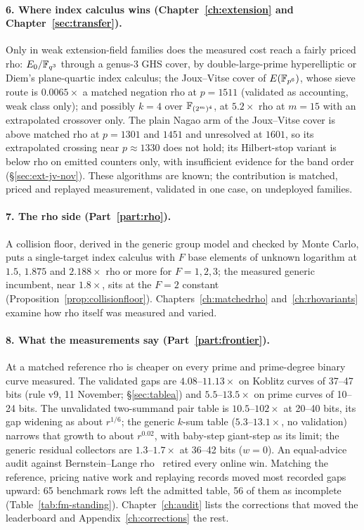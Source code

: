 \paragraph{6. Where index calculus wins (Chapter~\ref{ch:extension} and
Chapter~\ref{sec:transfer}).} Only in weak extension-field families does
the measured cost reach a fairly priced rho: $E_0/\mathbb{F}_{q^3}$ through a
genus-3 GHS cover, by double-large-prime hyperelliptic or Diem's
plane-quartic index calculus; the Joux--Vitse cover of $E(\mathbb{F}_{p^6})$,
whose sieve route is $0.0065\times$ a matched negation rho at $p=1511$
(validated as accounting, weak class only); and possibly $k=4$ over
$\mathbb{F}_{(2^m)^4}$, at $5.2\times$ rho at $m=15$ with an extrapolated
crossover only. The plain Nagao arm of the Joux--Vitse cover is above
matched rho at $p=1301$ and $1451$ and unresolved at $1601$, so its
extrapolated crossing near $p\approx1330$ does not hold; its Hilbert-stop
variant is below rho on emitted counters only, with insufficient evidence
for the band order (\S\ref{sec:ext-jv-nov}). These algorithms
are known; the contribution is matched, priced and replayed measurement,
validated in one case, on undeployed families.

\paragraph{7. The rho side (Part~\ref{part:rho}).} A collision floor,
derived in the generic group model and checked by Monte Carlo, puts a
single-target index calculus with $F$ base elements of unknown logarithm at
$1.5$, $1.875$ and $2.188\times$ rho or more for $F=1,2,3$; the measured
generic incumbent, near $1.8\times$, sits at the $F=2$ constant
(Proposition~\ref{prop:collisionfloor}). Chapters~\ref{ch:matchedrho}
and~\ref{ch:rhovariants} examine how rho itself was measured and varied.

\paragraph{8. What the measurements say (Part~\ref{part:frontier}).} At a
matched reference rho is cheaper on every prime and prime-degree binary
curve measured. The validated gaps are $4.08$--$11.13\times$ on Koblitz
curves of 37--47 bits (rule v9, 11 November; \S\ref{sec:tablea}) and $5.5$--$13.5\times$ on prime curves of 10--24 bits.
The unvalidated two-summand pair table is $10.5$--$102\times$ at 20--40
bits, its gap widening as about $r^{1/6}$; the generic $k$-sum table
($5.3$--$13.1\times$, no validation) narrows that growth to about
$r^{0.02}$, with baby-step giant-step as its limit; the generic residual
collectors are $1.3$--$1.7\times$ at 36--42 bits ($w=0$). An equal-advice
audit against Bernstein--Lange rho~\cite{bl2012} retired every online win.
Matching the reference, pricing native work and replaying records moved
most recorded gaps upward: 65 benchmark rows left the admitted table, 56 of
them as incomplete (Table~\ref{tab:fm-standing}). Chapter~\ref{ch:audit}
lists the corrections that moved the leaderboard and
Appendix~\ref{ch:corrections} the rest.


